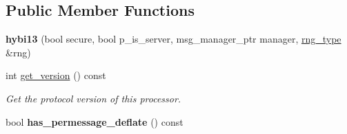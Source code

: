 \subsection*{Public Member Functions}
\begin{DoxyCompactItemize}
\item 
{\bfseries hybi13} (bool secure, bool p\+\_\+is\+\_\+server, msg\+\_\+manager\+\_\+ptr manager, \hyperlink{classwebsocketpp_1_1random_1_1none_1_1int__generator}{rng\+\_\+type} \&rng)\hypertarget{classwebsocketpp_1_1processor_1_1hybi13_af07830f45e2733bd75db70fe951416cf}{}\label{classwebsocketpp_1_1processor_1_1hybi13_af07830f45e2733bd75db70fe951416cf}

\item 
int \hyperlink{classwebsocketpp_1_1processor_1_1hybi13_afe89fa6418643711130ce3417451738b}{get\+\_\+version} () const\hypertarget{classwebsocketpp_1_1processor_1_1hybi13_afe89fa6418643711130ce3417451738b}{}\label{classwebsocketpp_1_1processor_1_1hybi13_afe89fa6418643711130ce3417451738b}

\begin{DoxyCompactList}\small\item\em Get the protocol version of this processor. \end{DoxyCompactList}\item 
bool {\bfseries has\+\_\+permessage\+\_\+deflate} () const\hypertarget{classwebsocketpp_1_1processor_1_1hybi13_af6ad6f16537a2d6c389c56f6cfaf3c57}{}\label{classwebsocketpp_1_1processor_1_1hybi13_af6ad6f16537a2d6c389c56f6cfaf3c57}


\end{DoxyCompactItemize}
